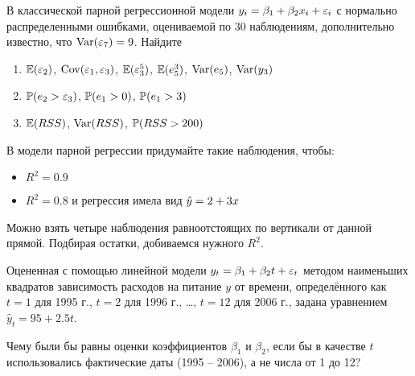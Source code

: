 \documentclass[pdftex,11pt,openany]{book}
\begin{document}
\begin{problem}
 В классической парной регрессионной модели $y_i = \beta_1 + \beta_2 x_i + \e_i$ с нормально распределенными ошибками, оцениваемой по 30 наблюдениям, дополнительно известно, что $\Var(\e_7)=9$. Найдите
\begin{enumerate}
\item $\E(\e_2)$, $\Cov(\e_1,\e_3)$, $\E(\e_3^5)$, $\E(e_5^3)$, $\Var(e_5)$, $\Var(y_3)$
\item $\P(e_2>\e_3)$, $\P(e_1>0)$, $\P(e_1>3)$
\item $\E(RSS)$, $\Var(RSS)$, $\P(RSS>200)$
\end{enumerate}
\end{problem}

\begin{solution}
\end{solution}


\begin{problem}
В модели парной регрессии придумайте такие наблюдения, чтобы:
\begin{itemize}
\item $R^2=0.9$
\item $R^2=0.8$ и регрессия имела вид $\hy=2+3x$
\end{itemize}
\end{problem}

\begin{solution}
 Можно взять четыре наблюдения равноотстоящих по вертикали от данной прямой. Подбирая остатки, добиваемся нужного $R^2$. 
 \end{solution}



\begin{problem}
Оцененная с помощью линейной модели $y_t = \beta_1 + \beta_2 t + \e_t$ методом наименьших квадратов зависимость расходов на питание $y$ от времени, определённого как $t = 1$ для 1995 г., $t = 2$ для 1996 г., \ldots, $t = 12$ для 2006 г., задана уравнением $\hat{y}_t = 95 + 2.5 t$.

Чему были бы равны оценки коэффициентов $\beta_1$ и $\beta_2$, если бы в качестве $t$ использовались фактические даты (1995 – 2006), а не числа от 1 до 12? 
\end{problem}
\end{document}
